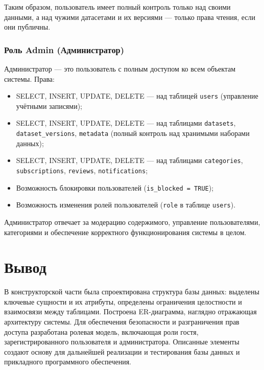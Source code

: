 Таким образом, пользователь имеет полный контроль только над своими данными, а
над чужими датасетами и их версиями --- только права чтения, если они публичны.

\subsubsection{Роль Admin (Администратор)}

Администратор --- это пользователь с полным доступом ко всем объектам системы.
Права:
\begin{itemize}
  \item SELECT, INSERT, UPDATE, DELETE --- над таблицей \texttt{users} (управление учётными записями);
  \item SELECT, INSERT, UPDATE, DELETE --- над таблицами \texttt{datasets}, \texttt{dataset\_versions}, \texttt{metadata} (полный контроль над хранимыми наборами данных);
  \item SELECT, INSERT, UPDATE, DELETE --- над таблицами \texttt{categories}, \texttt{subscriptions}, \texttt{reviews}, \texttt{notifications};
  \item Возможность блокировки пользователей (\texttt{is\_blocked = TRUE});
  \item Возможность изменения ролей пользователей (\texttt{role} в таблице \texttt{users}).
\end{itemize}

Администратор отвечает за модерацию содержимого, управление пользователями,
категориями и обеспечение корректного функционирования системы в целом.
\section*{Вывод}

В конструкторской части была спроектирована структура базы данных:
выделены ключевые сущности и их атрибуты, определены ограничения целостности
и взаимосвязи между таблицами. Построена ER-диаграмма, наглядно отражающая
архитектуру системы. Для обеспечения безопасности и разграничения прав доступа
разработана ролевая модель, включающая роли гостя, зарегистрированного
пользователя и администратора. Описанные элементы создают основу для дальнейшей
реализации и тестирования базы данных и прикладного программного обеспечения.